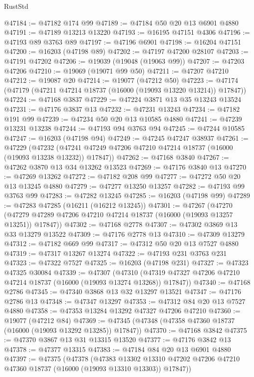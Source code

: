 \begin{lexlean}{RustStd}
\begin{coremodule}
@47184 := @47182 @174 @99
@47189 := @47184 @50 @20 @13 @6901 @4880
@47191 := @47189 @13213 @13220
@47193 := @16195 @47151 @4306
@47196 := @47193 @89 @3763 @89
@47197 := @47196 @6901
@47198 := @16204 @47151
@47200 := @16203 (@47198 @89)
@47202 := @47197 @47200 @28107
@47203 := @47191 @47202
@47206 := @19039 (@19048 (@19063 @99))
@47207 := @47203 @47206
@47210 := @19069 (@19071 @99 @50)
@47211 := @47207 @47210
@47212 := @19087 @20
@47214 := @19077 (@47212 @50)
@47223 := @47174 (@47179 (@47211 @47214 @18737 (@16000 (@19093 @13220 @13214)) @17847))
@47224 := @47168 @3837
@47229 := @47224 @3871 @13 @35 @13243 @13524
@47231 := @47176 @3837 @13
@47232 := @47231 @13243
@47234 := @47182 @191 @99
@47239 := @47234 @50 @20 @13 @10585 @4880
@47241 := @47239 @13231 @13238
@47244 := @47193 @94 @3763 @94
@47245 := @47244 @10585
@47247 := @16203 (@47198 @94)
@47249 := @47245 @47247 @38937
@47261 := @47229
    (@47232 (@47241 @47249 @47206 @47210 @47214 @18737 (@16000 (@19093 @13238 @13232)) @17847))
@47262 := @47168 @3840
@47267 := @47262 @3870 @13 @34 @13262 @13523
@47269 := @47176 @3840 @13
@47270 := @47269 @13262
@47272 := @47182 @208 @99
@47277 := @47272 @50 @20 @13 @13245 @4880
@47279 := @47277 @13250 @13257
@47282 := @47193 @99 @3763 @99
@47283 := @47282 @13245
@47285 := @16203 (@47198 @99)
@47289 := @47283 @47285 (@16211 (@16212 @13245))
@47301 := @47267
    (@47270 (@47279 @47289 @47206 @47210 @47214 @18737 (@16000 (@19093 @13257 @13251)) @17847))
@47302 := @47168 @2778
@47307 := @47302 @3869 @13 @33 @13279 @13522
@47309 := @47176 @2778 @13
@47310 := @47309 @13279
@47312 := @47182 @669 @99
@47317 := @47312 @50 @20 @13 @7527 @4880
@47319 := @47317 @13267 @13274
@47322 := @47193 @231 @3763 @231
@47323 := @47322 @7527
@47325 := @16203 (@47198 @231)
@47327 := @47323 @47325 @30084
@47339 := @47307
    (@47310 (@47319 @47327 @47206 @47210 @47214 @18737 (@16000 (@19093 @13274 @13268)) @17847))
@47340 := @47168 @2786
@47345 := @47340 @3868 @13 @32 @13297 @13521
@47347 := @47176 @2786 @13
@47348 := @47347 @13297
@47353 := @47312 @84 @20 @13 @7527 @4880
@47358 := @47353 @13284 @13292 @47327 @47206 @47210
@47360 := @19077 (@47212 @84)
@47369 := @47345 (@47348 (@47358 @47360 @18737 (@16000 (@19093 @13292 @13285)) @17847))
@47370 := @47168 @3842
@47375 := @47370 @3867 @13 @31 @13315 @13520
@47377 := @47176 @3842 @13
@47378 := @47377 @13315
@47383 := @47184 @84 @20 @13 @6901 @4880
@47397 := @47375
    (@47378
      (@47383
        @13302
        @13310
        @47202
        @47206
        @47210
        @47360
        @18737
        (@16000 (@19093 @13310 @13303))
        @17847))

\end{coremodule}
\end{lexlean}

